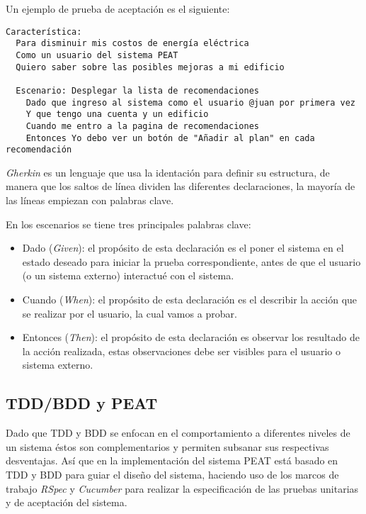 \vspace{2.5mm}

Un ejemplo de prueba de aceptación es el siguiente:
\begin{lstlisting}
Característica:
  Para disminuir mis costos de energía eléctrica
  Como un usuario del sistema PEAT
  Quiero saber sobre las posibles mejoras a mi edificio

  Escenario: Desplegar la lista de recomendaciones
    Dado que ingreso al sistema como el usuario @juan por primera vez
    Y que tengo una cuenta y un edificio
    Cuando me entro a la pagina de recomendaciones
    Entonces Yo debo ver un botón de "Añadir al plan" en cada recomendación
\end{lstlisting}

\textit{Gherkin} es un lenguaje que usa la identación para definir su estructura,
de manera que los saltos de línea dividen las diferentes declaraciones,
la mayoría de las líneas empiezan con palabras clave.


\vspace{2.5mm}

En los escenarios se tiene tres principales palabras clave:
\begin{itemize}
\item Dado (\textit{Given}): el propósito de esta declaración es el poner
  el sistema en el estado deseado para iniciar la prueba correspondiente,
  antes de que el usuario (o un sistema externo) interactué con el sistema.
\item Cuando (\textit{When}): el propósito de esta declaración es el describir
  la acción que se realizar por el usuario, la cual vamos a probar.
\item Entonces (\textit{Then}): el propósito de esta declaración es observar
  los resultado de la acción realizada, estas observaciones debe ser visibles
  para el usuario o sistema externo.
\end{itemize}

\subsection{TDD/BDD y PEAT}
Dado que TDD y BDD se enfocan en el comportamiento a diferentes niveles
de un sistema éstos son complementarios y permiten subsanar sus respectivas
desventajas. Así que en la implementación del sistema PEAT está basado en
TDD y BDD para guiar el diseño del sistema, haciendo uso de los marcos
de trabajo \textit{RSpec} y \textit{Cucumber} para realizar la especificación
de las pruebas unitarias y de aceptación del sistema.

